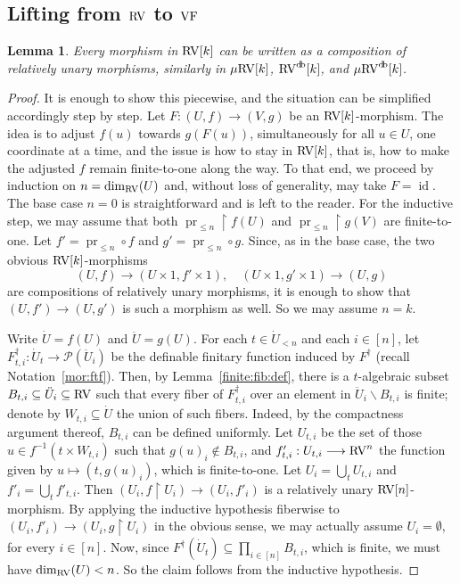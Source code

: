 \documentclass[12pt]{amsart}
\theoremstyle{plain}
\newtheorem{lem}[thm]{Lemma}
\theoremstyle{definition}
\theoremstyle{remark}
\numberwithin{equation}{section}
\theoremstyle{plain}
\newcommand{\VF}{\textup{VF}}
\newcommand{\RV}{\textup{RV}}
\DeclareMathOperator{\id}{id}
\DeclareMathOperator{\pr}{pr}
\newcommand{\0}{\emptyset}
\newcommand{\mdl}[1]{\mathcal{#1}}  %
\newcommand{\rest}{\upharpoonright}
\newcommand{\fun}{\longrightarrow}
\newcommand{\efun}{\longmapsto}
\newcommand{\sub}{\subseteq}
\newcommand{\mi}{\smallsetminus}
\newcommand{\mVF}{{\mu}{\VF}}
\newcommand{\mRV}{{\mu}{\RV}}
\DeclareMathOperator{\db}{d \! b}
\begin{document}

\subsection{Lifting from $\RV$ to $\VF$}


\begin{lem}\label{bijection:partitioned:unary}
Every morphism in $\RV[k]$ can be written as a composition of relatively unary morphisms, similarly in $\mRV[k]$, $\RV^{\db}[k]$, and $\mRV^{\db}[k]$.
\end{lem}
\begin{proof}
It is enough to show this piecewise, and the situation can be  simplified accordingly step by step. Let $F : (U, f) \fun (V, g)$ be an $\RV[k]$-morphism. The idea is to adjust  $f(u)$ towards $g(F(u))$, simultaneously for all $u \in U$, one coordinate at a time, and the issue is how to stay in $\RV[k]$, that is, how to make the adjusted $f$ remain finite-to-one along the way. To that end, we proceed by induction on $n = \dim_{\RV}(U)$ and, without loss of generality, may take $F = \id$. The base case $n=0$ is straightforward and is left to the reader. For the inductive step, we may assume that both $\pr_{\leq n} \rest f(U)$ and $\pr_{\leq n} \rest g(V)$ are finite-to-one. Let $f' = \pr_{\leq n} \circ f$ and $g' = \pr_{\leq n} \circ g$. Since, as in the base case, the two obvious $\RV[k]$-morphisms
\[
(U,f) \fun (U \times 1, f' \times 1), \quad (U \times 1, g' \times 1) \fun (U, g)
\]
are compositions of relatively unary morphisms, it is enough to show that $(U, f') \fun (U, g')$ is such a morphism as well. So we may assume $n=k$.

Write $\dot U = f(U)$ and $\ddot U = g(U)$. For each $t \in \dot U_{< n}$ and each $i \in [n]$, let
$F^\dag_{t, i} : \dot U_t \fun \mdl P(\ddot U_i)$
be the definable finitary function induced by $F^\dag$ (recall Notation~\ref{mor:ftf}). Then, by Lemma~\ref{finite:fib:def}, there is a $t$-algebraic subset $B_{t, i} \sub \ddot U_i \sub \RV$ such that every fiber of $F^\dag_{t, i}$ over an element in $\ddot U_i \mi B_{t, i}$ is finite; denote by $W_{t, i} \sub \dot U$ the union of such fibers. Indeed, by the compactness argument thereof,  $B_{t, i}$ can be defined uniformly. Let $U_{t, i}$ be the set of those $u \in f^{-1}( t \times W_{t, i})$ such that $g(u)_i \notin B_{t, i}$, and $f'_{t, i} : U_{t, i} \fun \RV^n$ the function given by $u \efun (t, g(u)_i)$, which is finite-to-one. Let $U_i = \bigcup_{t}  U_{t, i}$ and $f'_i = \bigcup_{t}  f'_{t, i}$. Then $(U_i, f \rest U_i) \fun (U_i, f'_i)$ is a relatively unary $\RV[n]$-morphism. By applying the inductive hypothesis fiberwise to $(U_i, f'_i) \fun (U_i, g \rest U_i)$ in the obvious sense, we may actually assume $U_i = \0$, for every $i \in [n]$. Now, since $F^\dag(\dot U_t) \sub \prod_{i \in [n]} B_{t, i}$, which is finite, we must have $\dim_{\RV}(U) < n$. So the claim follows from the inductive hypothesis.


\end{proof}
\end{document}
